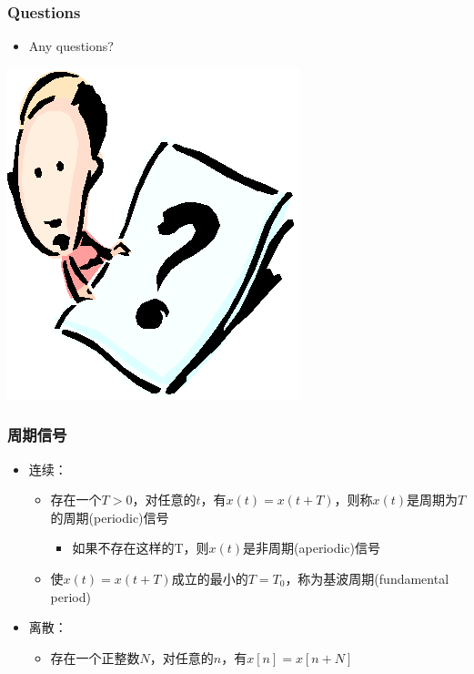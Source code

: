 \documentclass[CJKutf8,dvipsnames,table]{beamer}
\begin{document}
\begin{CJK*}{UTF8}{song}
  \begin{frame}
    \frametitle{Questions}
    \begin{itemize}
    \item Any questions?
    \end{itemize}
    \begin{center}
      \includegraphics[scale=.5]{question}
    \end{center}
  \end{frame}
  
  \begin{frame}
    \frametitle{周期信号}
    \begin{itemize}
    \item 连续：
    \begin{itemize}
    \item 存在一个$T>0$，对任意的$t$，有$x(t)=x(t+T)$，则称$x(t)$是周期为$T$的周期(periodic)信号
    \begin{itemize}
    \item 如果不存在这样的T，则$x(t)$是非周期(aperiodic)信号
    \end{itemize}
    \item 使$x(t)=x(t+T)$成立的最小的$T=T_0$，称为基波周期(fundamental period)
    \end{itemize}
    \item 离散：
    \begin{itemize}
    \item 存在一个正整数$N$，对任意的$n$，有$x[n]=x[n+N]$
    \end{itemize}
    \end{itemize}
  \end{frame}  
  

\end{CJK*}
\end{document}
